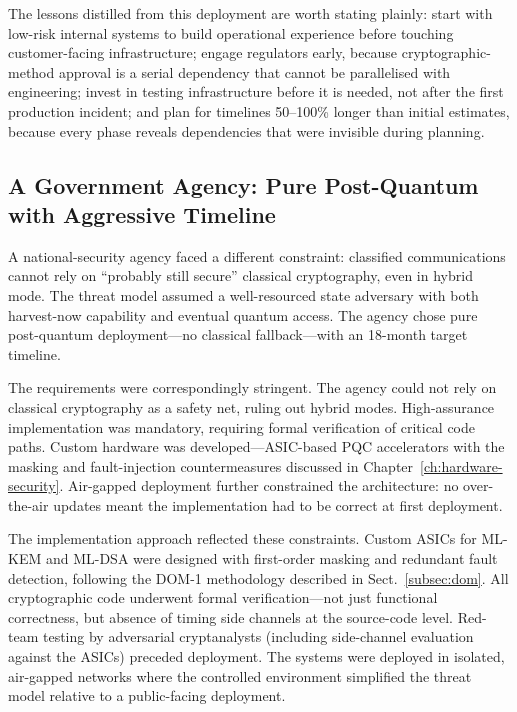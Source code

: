 The lessons distilled from this deployment are worth stating plainly: start with low-risk internal systems to build operational experience before touching customer-facing infrastructure; engage regulators early, because cryptographic-method approval is a serial dependency that cannot be parallelised with engineering; invest in testing infrastructure before it is needed, not after the first production incident; and plan for timelines 50--100\% longer than initial estimates, because every phase reveals dependencies that were invisible during planning.


\subsection{A Government Agency: Pure Post-Quantum with Aggressive Timeline}
\label{subsec:case-government}

A national-security agency faced a different constraint: classified communications cannot rely on ``probably still secure'' classical cryptography, even in hybrid mode.  The threat model assumed a well-resourced state adversary with both harvest-now capability and eventual quantum access.  The agency chose pure post-quantum deployment---no classical fallback---with an 18-month target timeline.

The requirements were correspondingly stringent.  The agency could not rely on classical cryptography as a safety net, ruling out hybrid modes.  High-assurance implementation was mandatory, requiring formal verification of critical code paths.  Custom hardware was developed---ASIC-based PQC accelerators with the masking and fault-injection countermeasures discussed in Chapter~\ref{ch:hardware-security}.  Air-gapped deployment further constrained the architecture: no over-the-air updates meant the implementation had to be correct at first deployment.

The implementation approach reflected these constraints.  Custom ASICs for ML-KEM and ML-DSA were designed with first-order masking and redundant fault detection, following the DOM-1 methodology described in Sect.~\ref{subsec:dom}.  All cryptographic code underwent formal verification---not just functional correctness, but absence of timing side channels at the source-code level.  Red-team testing by adversarial cryptanalysts (including side-channel evaluation against the ASICs) preceded deployment.  The systems were deployed in isolated, air-gapped networks where the controlled environment simplified the threat model relative to a public-facing deployment.

